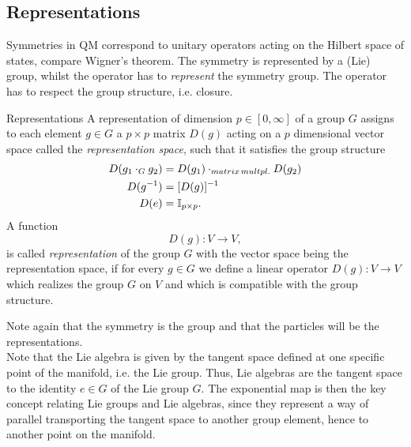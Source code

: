  \subsection{Representations}
 Symmetries in QM correspond to unitary operators acting on the Hilbert space of states, compare Wigner's theorem. The symmetry is represented by a (Lie) group, whilst the operator has to \emph{represent} the symmetry group. The operator has to respect the group structure, i.e. closure.
\begin{mybox}{Representations}
	A representation of dimension $p\in[0,\infty]$ of a group $G$ assigns to each element $g\in G$ a $p\times p$ matrix $D(g)$ acting on a $p$ dimensional vector space called the \emph{representation space}, such that it satisfies the group structure
	\begin{align}
		 D(g_1 \cdot_G g_2)&= D(g_1) \cdot_{matrix\,multpl.} D(g_2)\\
		 D(g^{-1}) &= [D(g)]^{-1}\\
		 D(e) &= \mathbb{I}_{p\times p}.
	\end{align}
A function 
\begin{equation}
D(g) : V \rightarrow V,
\end{equation}
is called \emph{representation} of the group $G$ with the vector space being the representation space, if for every $g\in G$ we define a linear operator $D(g):V\rightarrow V$ which realizes the group $G$ on $V$ and which is compatible with the group structure.
\end{mybox}
Note again that the symmetry is the group and that the particles will be the representations.\\
Note that the Lie algebra is given by the tangent space defined at one specific point of the manifold, i.e. the Lie group. Thus, Lie algebras are the tangent space to the identity $e\in G$ of the Lie group $G$. The exponential map is then the key concept relating Lie groups and Lie algebras, since they represent a way of parallel transporting the tangent space to another group element, hence to another point on the manifold.
